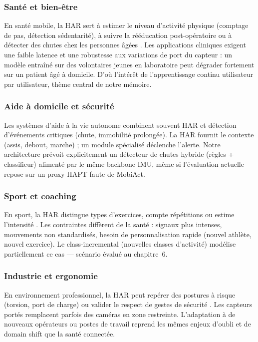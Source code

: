 \documentclass[a4paper,12pt]{report}
\begin{document}
\subsubsection{Santé et bien-être}

En santé mobile, la HAR sert à estimer le niveau d'activité physique (comptage
de pas, détection sédentarité), à suivre la rééducation post-opératoire ou à
détecter des chutes chez les personnes âgées \parencite{gu2021}. Les applications
cliniques exigent une faible latence et une robustesse aux variations de port du
capteur : un modèle entraîné sur des volontaires jeunes en laboratoire peut
dégrader fortement sur un patient âgé à domicile. D'où l'intérêt de
l'apprentissage continu utilisateur par utilisateur, thème central de notre
mémoire.

\subsubsection{Aide à domicile et sécurité}

Les systèmes d'aide à la vie autonome combinent souvent HAR et détection
d'événements critiques (chute, immobilité prolongée). La HAR fournit le contexte
(assis, debout, marche) ; un module spécialisé déclenche l'alerte. Notre
architecture prévoit explicitement un détecteur de chutes hybride (règles +
classifieur) alimenté par le même backbone IMU, même si l'évaluation actuelle
repose sur un proxy HAPT faute de MobiAct.

\subsubsection{Sport et coaching}

En sport, la HAR distingue types d'exercices, compte répétitions ou estime
l'intensité \parencite{wang2019}. Les contraintes diffèrent de la santé : signaux
plus intenses, mouvements non standardisés, besoin de personnalisation rapide
(nouvel athlète, nouvel exercice). Le class-incremental (nouvelles classes
d'activité) modélise partiellement ce cas — scénario évalué au chapitre~6.

\subsubsection{Industrie et ergonomie}

En environnement professionnel, la HAR peut repérer des postures à risque
(torsion, port de charge) ou valider le respect de gestes de sécurité
\parencite{gu2021}. Les capteurs portés remplacent parfois des caméras en zone
restreinte. L'adaptation à de nouveaux opérateurs ou postes de travail reprend
les mêmes enjeux d'oubli et de domain shift que la santé connectée.
\end{document}
